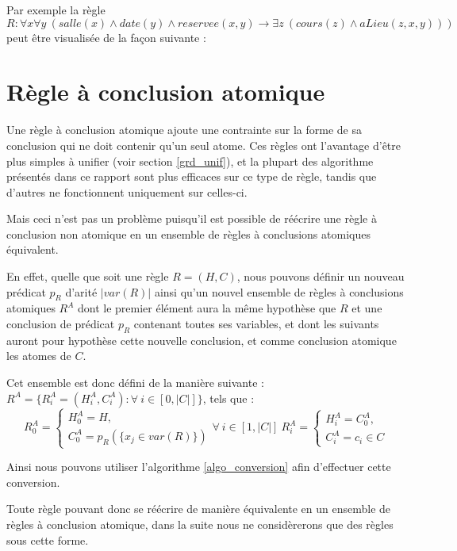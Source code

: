 Par exemple la règle 
$R : \forall x \forall y\ (salle(x) \wedge date(y) \wedge reservee(x,y) 
\rightarrow \exists z\ (cours(z) \wedge aLieu(z,x,y)))$ 
peut être visualisée de la façon suivante :



\section{Règle à conclusion atomique}\label{def_regle_atomique}
Une règle à conclusion atomique ajoute une contrainte sur la forme de sa conclusion qui
ne doit contenir qu'un seul atome.
Ces règles ont l'avantage d'être plus simples à unifier (voir section \ref{grd_unif}), et
la plupart des algorithme présentés dans ce rapport sont plus efficaces sur ce type de
règle, tandis que d'autres ne fonctionnent uniquement sur celles-ci.

Mais ceci n'est pas un problème puisqu'il est possible de réécrire une règle à
conclusion non atomique en un ensemble de règles à conclusions atomiques équivalent.

En effet, quelle que soit une règle $R = (H,C)$, nous pouvons définir un nouveau prédicat
$p_R$ d'arité $|var(R)|$ ainsi qu'un nouvel ensemble de règles à conclusions atomiques 
$R^{A}$ dont le premier
élément aura la même hypothèse que $R$ et une conclusion de prédicat $p_R$ contenant 
toutes ses variables, et dont les suivants auront pour hypothèse cette nouvelle
conclusion, et comme conclusion atomique les atomes de $C$.

Cet ensemble est donc défini de la manière suivante :\\
$R^{A} =\{R^{A}_i = (H^{A}_i,C^{A}_i) : \forall\ i \in [0,|C|]\}$, tels que :\\
$$
	R^{A}_0 =
	\begin{cases}
		H^{A}_0 = H,\\
		C^{A}_0 = p_R(\{x_j \in var(R)\})
	\end{cases}
	\forall\ i \in [1,|C|]\ R^{A}_i =
	\begin{cases}
		H^{A}_i = C^{A}_0,\\
		C^{A}_i = c_i \in C
	\end{cases}
$$

Ainsi nous pouvons utiliser l'algorithme \ref{algo_conversion} afin d'effectuer cette
conversion.

Toute règle pouvant donc se réécrire de manière 
équivalente en un ensemble de
règles à conclusion atomique, dans la suite nous ne considèrerons que des règles sous cette 
forme.




